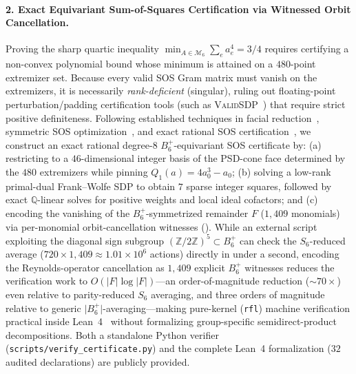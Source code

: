 \documentclass[11pt,a4paper]{article}
\theoremstyle{plain}
\theoremstyle{definition}
\theoremstyle{remark}
\newcommand{\Z}{\mathbb{Z}}
\newcommand{\Q}{\mathbb{Q}}
\newcommand{\Mman}{\mathcal{M}_6}
\newcommand{\Bplus}{B_6^+}
\newcommand{\code}[1]{\texttt{\small #1}}
\begin{document}
\paragraph{2. Exact Equivariant Sum-of-Squares Certification via Witnessed Orbit Cancellation.}
Proving the sharp quartic inequality $\min_{A\in\Mman}\sum_e a_e^4 = 3/4$ requires certifying a non-convex polynomial bound whose minimum is attained on a $480$-point extremizer set. Because every valid SOS Gram matrix must vanish on the extremizers, it is necessarily \emph{rank-deficient} (singular), ruling out floating-point perturbation/padding certification tools (such as \textsc{ValidSDP}~\cite{MartinDorelRoux2017,Roux2018}) that require strict positive definiteness. Following established techniques in facial reduction~\cite{PermenterParrilo2018}, symmetric SOS optimization~\cite{GatermannParrilo2004,Riener2013}, and exact rational SOS certification~\cite{PeyrlParrilo2008,Kaltofen2008,Kaltofen2012,MagronSafeyElDin2018}, we construct an exact rational degree-$8$ $\Bplus$-equivariant SOS certificate by: (a) restricting to a $46$-dimensional integer basis of the PSD-cone face determined by the $480$ extremizers while pinning $Q_1(a) = 4a_0^3 - a_0$; (b) solving a low-rank primal-dual Frank--Wolfe SDP to obtain $7$ sparse integer squares, followed by exact $\Q$-linear solves for positive weights and local ideal cofactors; and (c) encoding the vanishing of the $\Bplus$-symmetrized remainder $F$ ($1{,}409$ monomials) via per-monomial orbit-cancellation witnesses (). While an external script exploiting the diagonal sign subgroup $(\Z/2\Z)^5 \subset \Bplus$ can check the $S_6$-reduced average ($720 \times 1{,}409 \approx 1.01\times 10^6$ actions) directly in under a second, encoding the Reynolds-operator cancellation as $1{,}409$ explicit $\Bplus$ witnesses reduces the verification work to $O(\lvert F\rvert \log \lvert F\rvert)$---an order-of-magnitude reduction ($\sim 70\times$) even relative to parity-reduced $S_6$ averaging, and three orders of magnitude relative to generic $\lvert\Bplus\rvert$-averaging---making pure-kernel (\code{rfl}) machine verification practical inside Lean~4~\cite{deMouraUllrich2021,Mathlib2020} without formalizing group-specific semidirect-product decompositions. Both a standalone Python verifier (\code{scripts/verify\_certificate.py}) and the complete Lean~4 formalization ($32$ audited declarations) are publicly provided.
\end{document}
